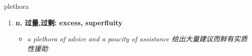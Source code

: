 
\begin{frame}
{\huge plethora}
\begin{center}
\begin{enumerate}\Large
  \item \textbf{n. 过量,过剩: excess, superfluity}
  \begin{itemize}
    \item \em{\Large{a plethora of advice and a paucity of assistance 给出大量建议而鲜有实质性援助}}
  \end{itemize}
\end{enumerate}
\end{center}
\end{frame}
